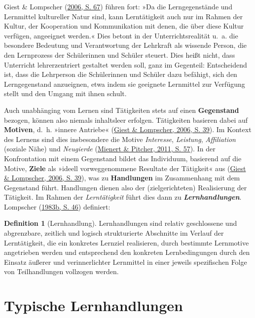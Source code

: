 \documentclass[
]{scrbook}
\theoremstyle{definition}
\newtheorem{definition}{Definition}[chapter]
\theoremstyle{definition}
\theoremstyle{definition}
\theoremstyle{definition}
\theoremstyle{remark}
\begin{document}
Giest \& Lompscher (\protect\hyperlink{ref-Giest2006}{2006, S. 67}) führen fort: »Da die Lerngegenstände und Lernmittel kultureller Natur sind, kann Lerntätigkeit auch nur im Rahmen der Kultur, der Kooperation und Kommunikation mit denen, die über diese Kultur verfügen, angeeignet werden.« Dies betont in der Unterrichtsrealität u.~a. die besondere Bedeutung und Verantwortung der Lehrkraft als wissende Person, die den Lernprozess der Schülerinnen und Schüler steuert. Dies heißt nicht, dass Unterricht lehrerzentriert gestaltet werden soll, ganz im Gegenteil: Entscheidend ist, dass die Lehrperson die Schülerinnen und Schüler dazu befähigt, sich den Lerngegenstand anzueignen, etwa indem sie geeignete Lernmittel zur Verfügung stellt und den Umgang mit ihnen schult.

Auch unabhänging vom Lernen sind Tätigkeiten stets auf einen \textbf{Gegenstand} bezogen, können also niemals inhaltsleer erfolgen. Tätigkeiten basieren dabei auf \textbf{Motiven}, d.~h. »innere Antriebe« (\protect\hyperlink{ref-Giest2006}{Giest \& Lompscher, 2006, S. 39}). Im Kontext des Lernens sind dies insbesondere die Motive \emph{Interesse}, \emph{Leistung}, \emph{Affiliation} (soziale Nähe) und \emph{Neugierde} (\protect\hyperlink{ref-Mienert2011}{Mienert \& Pitcher, 2011, S. 57}). In der Konfrontation mit einem Gegenstand bildet das Individuum, basierend auf die Motive, \textbf{Ziele} als »ideell vorweggenommene Resultate der Tätigkeit« aus (\protect\hyperlink{ref-Giest2006}{Giest \& Lompscher, 2006, S. 39}), was zu \textbf{Handlungen} im Zusammenhang mit dem Gegenstand führt. Handlungen dienen also der (zielgerichteten) Realisierung der Tätigkeit.
Im Rahmen der \emph{Lerntätigkeit} führt dies dann zu \textbf{\emph{Lernhandlungen}}. Lompscher (\protect\hyperlink{ref-Lompscher1983}{1983b, S. 46}) definiert:

\begin{definition}[Lernhandlung]
\protect\hypertarget{def:Lernhandlung}{}\label{def:Lernhandlung}Lernhandlungen sind relativ geschlossene und abgrenzbare, zeitlich und logisch strukturierte Abschnitte im Verlauf der Lerntätigkeit, die ein konkretes Lernziel realisieren, durch bestimmte Lernmotive angetrieben werden und entsprechend den konkreten Lernbedingungen durch den Einsatz äußerer und verinnerlichter Lernmittel in einer jeweils spezifischen Folge von Teilhandlungen vollzogen werden.
\end{definition}

\hypertarget{typische-lernhandlungen}{%
\section{Typische Lernhandlungen}\label{typische-lernhandlungen}}
\end{document}
